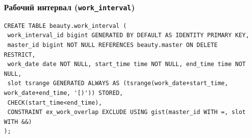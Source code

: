 \documentclass[11pt,a4paper]{article}
\begin{document}
\par\medskip\noindent\begin{minipage}{\linewidth}
\subsubsection*{Рабочий интервал (\texttt{work\_\allowbreak{}interval})}
\begin{lstlisting}[style=sql]
CREATE TABLE beauty.work_interval (
 work_interval_id bigint GENERATED BY DEFAULT AS IDENTITY PRIMARY KEY,
 master_id bigint NOT NULL REFERENCES beauty.master ON DELETE RESTRICT,
 work_date date NOT NULL, start_time time NOT NULL, end_time time NOT NULL,
 slot tsrange GENERATED ALWAYS AS (tsrange(work_date+start_time, work_date+end_time, '[)')) STORED,
 CHECK(start_time<end_time),
 CONSTRAINT ex_work_overlap EXCLUDE USING gist(master_id WITH =, slot WITH &&)
);
\end{lstlisting}
\end{minipage}\par\medskip
\end{document}
